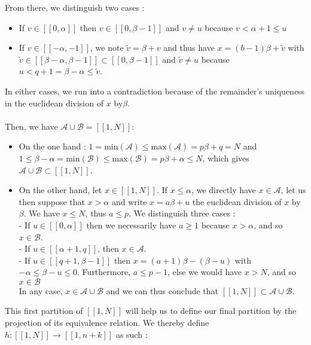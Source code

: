 From there, we distinguish two cases :
\begin{itemize}
\item If \(v \in [\![0,\alpha]\!]\) then \(v \in [\![0,\beta - 1]\!]\) and \(v \neq u\) because \(v < \alpha + 1
\leqslant u\)
\item If \(v \in [\![-\alpha,-1]\!]\), we note \(\tilde{v} = \beta + v\) and thus have \(x = (b-1)\beta + \tilde{v}\)
with \(\tilde{v} \in [\![\beta - \alpha,\beta - 1]\!] \subset [\![0,\beta - 1]\!]\) and \(\tilde{v} \neq u\) because
\(u< q+1 = \beta - \alpha \leqslant \tilde{v}\).
\end{itemize}
In either cases, we run into a contradiction because of the remainder's uniqueness in the euclidean division of \(x\)
by\(\beta\).\\
\\
Then, we have \underline{\(\mathcal{A} \cup \mathcal{B} = [\![1,N]\!]\)}:
\begin{itemize}
	\item On the one hand : \(1 = \text{min}(\mathcal{A}) \leqslant \text{max}(\mathcal{A}) = p\beta + q = N\) and
\(1 \leqslant \beta - \alpha = \text{min}(\mathcal{B}) \leqslant \text{max}(\mathcal{B}) = p\beta + \alpha \leqslant
N\),
	which gives \(\mathcal{A} \cup \mathcal{B} \subset [\![1,N]\!]\).
\item On the other hand, let \(x \in [\![1,N]\!]\). If \(x \leqslant \alpha\), we directly have \(x \in \mathcal{A}\),
let us then suppose that \(x > \alpha\) and write \(x = a\beta + u\)
the euclidean division of \(x\) by \(\beta\). We have \(x \leqslant N\), thus \(a \leqslant p\). We distinguish three
cases : \\
- If \(u \in [\![0,\alpha]\!]\) then we necessarily have \(a \geqslant 1\) because \(x > \alpha\), and so \(x \in
\mathcal{B}\).\\
	- If \(u \in [\![\alpha + 1,q]\!]\), then \(x \in \mathcal{A}\). \\
- If \(u \in [\![q + 1,\beta - 1]\!]\) then \(x = (a+1)\beta - (\beta - u)\) with \(-\alpha \leqslant \beta - u
\leqslant 0\).
	Furthermore, \(a \leqslant p - 1\), else we would have \(x > N\), and so \(x \in \mathcal{B}\) \\
In any case, \(x \in \mathcal{A} \cup \mathcal{B}\) and we can thus conclude that \([\![1,N]\!] \subset \mathcal{A}
\cup\mathcal{B}\).
\end{itemize}
This first partition of \([\![1,N]\!]\) will help us to define our final partition by the projection of its equivalence
relation.
We thereby define \(h : [\![1,N]\!] \longrightarrow [\![1,n+k]\!]\) as such :\\
